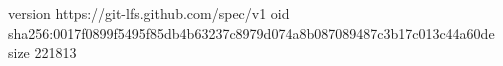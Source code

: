 version https://git-lfs.github.com/spec/v1
oid sha256:0017f0899f5495f85db4b63237c8979d074a8b087089487c3b17c013c44a60de
size 221813

